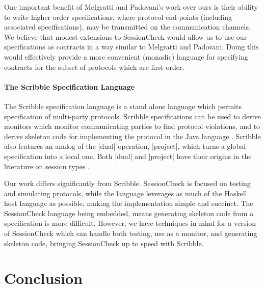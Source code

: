 \documentclass{article}
\begin{document}
One important benefit of Melgratti and Padovani's work over ours is
their ability to write higher order specifications, where protocol
end-points (including associated specifications), may be transmitted
on the communication channels.
%
We believe that modest extensions to SessionCheck would allow us to
use our specifications as contracts in a way similar to Melgratti and
Padovani.
%
Doing this would effectively provide a more convenient (monadic)
language for specifying contracts for the subset of protocols which
are first order.
%

\paragraph{The Scribble Specification Language}
%
The Scribble specification language \cite{Scribble} is a stand alone language
which permits specification of multi-party protocols.
%
Scribble specifications can be used to derive monitors which monitor communicating
parties to find protocol violations, and to derive skeleton code for implementing
the protocol in the Java language \cite{Java}.
%
Scribble also features an analog of the |dual| operation, |project|, which turns a
global specification into a local one.
%
Both |dual| and |project| have their origins in the literature on session types
\cite{HondaSessionTypes, WadlerSessionTypes}.

Our work differs significantly from Scribble.
%
SessionCheck is focused on testing and simulating protocols, while the language
leverages as much of the Haskell host language as possible, making the implementation
simple and succinct.
%
The SessionCheck language being embedded, means generating skeleton code from a
specification is more difficult.
%
However, we have techniques in mind for a version of SessionCheck which can handle
both testing, use as a monitor, and generating skeleton code, bringing SessionCheck
up to speed with Scribble.
%

\section{Conclusion}




\end{document}
